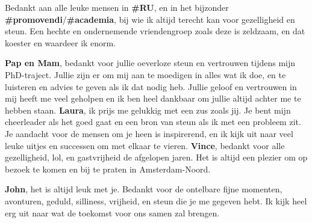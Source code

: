 Bedankt aan alle leuke mensen in \textbf{\#RU}, en in het bijzonder \textbf{\#promovendi}/\textbf{\#academia}, bij wie ik altijd terecht kan voor gezelligheid en steun. Een hechte en ondernemende vriendengroep zoals deze is zeldzaam, en dat koester en waardeer ik enorm.

\textbf{Pap en Mam}, bedankt voor jullie oeverloze steun en vertrouwen tijdens mijn PhD-traject. Jullie zijn er om mij aan te moedigen in alles wat ik doe, en te luisteren en advies te geven als ik dat nodig heb. Jullie geloof en vertrouwen in mij heeft me veel geholpen en ik ben heel dankbaar om jullie altijd achter me te hebben staan. 
\textbf{Laura}, ik prijs me gelukkig met een zus zoals jij. Je bent mijn cheerleader als het goed gaat en een bron van steun als ik met een probleem zit. Je aandacht voor de mensen om je heen is inspirerend, en ik kijk uit naar veel leuke uitjes en successen om met elkaar te vieren. \textbf{Vince}, bedankt voor alle gezelligheid, lol, en gastvrijheid de afgelopen jaren. Het is altijd een plezier om op bezoek te komen en bij te praten in Amsterdam-Noord. 

\textbf{John}, het is altijd leuk met je. Bedankt voor de ontelbare fijne momenten, avonturen, geduld, silliness, vrijheid, en steun die je me gegeven hebt. Ik kijk heel erg uit naar wat de toekomst voor ons samen zal brengen.  